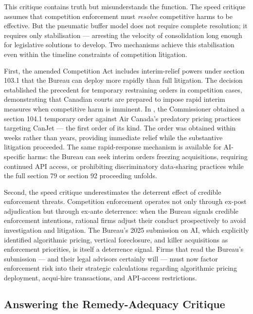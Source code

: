This critique contains truth but misunderstands the function. The speed critique assumes that competition enforcement must \textit{resolve} competitive harms to be effective. But the pneumatic buffer model does not require complete resolution; it requires only stabilisation --- arresting the velocity of consolidation long enough for legislative solutions to develop. Two mechanisms achieve this stabilisation even within the timeline constraints of competition litigation.

First, the amended Competition Act includes interim-relief powers under section 103.1 that the Bureau can deploy more rapidly than full litigation. The  decision established the precedent for temporary restraining orders in competition cases, demonstrating that Canadian courts are prepared to impose rapid interim measures when competitive harm is imminent. In , the Commissioner obtained a section 104.1 temporary order against Air Canada's predatory pricing practices targeting CanJet --- the first order of its kind. The order was obtained within weeks rather than years, providing immediate relief while the substantive litigation proceeded. The same rapid-response mechanism is available for AI-specific harms: the Bureau can seek interim orders freezing acquisitions, requiring continued API access, or prohibiting discriminatory data-sharing practices while the full section 79 or section 92 proceeding unfolds.

Second, the speed critique underestimates the deterrent effect of credible enforcement threats. Competition enforcement operates not only through ex-post adjudication but through ex-ante deterrence: when the Bureau signals credible enforcement intentions, rational firms adjust their conduct prospectively to avoid investigation and litigation. The Bureau's 2025 submission on AI, which explicitly identified algorithmic pricing, vertical foreclosure, and killer acquisitions as enforcement priorities, is itself a deterrence signal. Firms that read the Bureau's submission --- and their legal advisors certainly will --- must now factor enforcement risk into their strategic calculations regarding algorithmic pricing deployment, acqui-hire transactions, and API-access restrictions.

\subsection{Answering the Remedy-Adequacy Critique}

